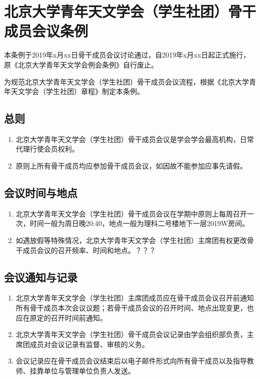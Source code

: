 \chapter{北京大学青年天文学会（学生社团）骨干成员会议条例}

本条例于2019年x月xx日骨干成员会议讨论通过，自2019年x月xx日起正式施行，原《北京大学青年天文学会例会条例》自行废止。

为规范北京大学青年天文学会（学生社团）骨干成员会议流程，根据《北京大学青年天文学会（学生社团）章程》制定本条例。

\section{总则}

\begin{enumerate}
    \item 北京大学青年天文学会（学生社团）骨干成员会议是学会学会最高机构，日常代理行使会员权利。
    
    \item 原则上所有骨干成员均应参加骨干成员会议，如因故不能参加应事先请假。
\end{enumerate}

\section{会议时间与地点}

\begin{enumerate}[resume]
    \item 北京大学青年天文学会（学生社团）骨干成员会议在学期中原则上每周召开一次，时间一般为周日晚20:40，地点一般为理科二号楼地下一层2019W房间。
    
    \item 如遇放假等特殊情况，北京大学青年天文学会（学生社团）主席团有权更改骨干成员会议的召开频率、时间和地点。？？？
\end{enumerate}

\section{会议通知与记录}

\begin{enumerate}[resume]
    \item 北京大学青年天文学会（学生社团）主席团成员应在骨干成员会议召开前通知所有骨干成员本次会议议题；若骨干成员会议的召开时间、地点出现变更，也应在原定的召开时间前通知。
    
    \item 北京大学青年天文学会（学生社团）骨干成员会议记录由学会组织部负责，主席团成员对会议记录有监督、审核的义务。
    
    \item 会议记录应在骨干成员会议结束后以电子邮件形式向所有骨干成员以及指导教师、挂靠单位与管理单位负责人发送。
\end{enumerate}

